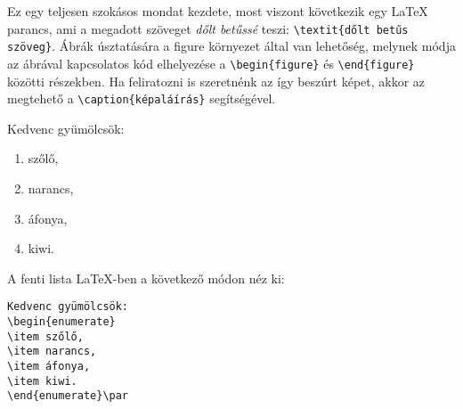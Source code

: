 \documentclass{article}
\begin{document}
Ez egy teljesen szokásos mondat kezdete, most viszont következik egy LaTeX parancs, ami a megadott szöveget \textit{dőlt betűssé} teszi: \verb|\textit{dőlt betűs szöveg}|. Ábrák úsztatására a figure környezet által van lehetőség, melynek módja az ábrával kapcsolatos kód elhelyezése a \verb|\begin{figure}| és \verb|\end{figure}| közötti részekben. Ha feliratozni is szeretnénk az így beszúrt képet, akkor az megtehető a \verb|\caption{képaláírás}| segítségével.\par
Kedvenc gyümölcsök:
\begin{enumerate}
\item szőlő,
\item narancs,
\item áfonya,
\item kiwi.
\end{enumerate}\par
A fenti lista LaTeX-ben a következő módon néz ki:
\begin{verbatim}
Kedvenc gyümölcsök:
\begin{enumerate}
\item szőlő,
\item narancs,
\item áfonya,
\item kiwi.
\end{enumerate}\par
\end{verbatim}
\end{document}
